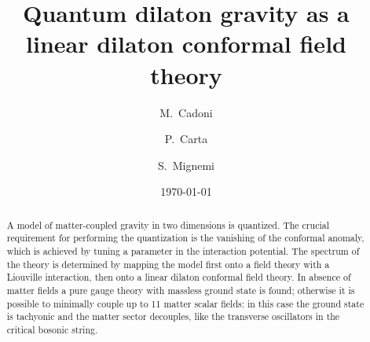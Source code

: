\documentclass[a4paper,aps,prd,twocolumn,groupedaddress]{revtex4}
\begin{document}
\preprint{INFNCA-TH0201]}

\title{Quantum dilaton gravity as a linear dilaton conformal field theory}

\author{M.~Cadoni}
\author{P.~Carta}

\author{S.~Mignemi}


\date{\today}

\begin{abstract}
A model of matter-coupled gravity in two dimensions is quantized.  The
crucial requirement for performing the quantization is the vanishing
of the conformal anomaly, which is achieved by tuning a parameter in
the interaction potential. The spectrum of the theory is determined by
mapping the model first onto a field theory with a Liouville
interaction, then onto a linear dilaton conformal field theory. In
absence of matter fields a pure gauge theory with massless ground
state is found; otherwise it is possible to minimally couple up to 11
matter scalar fields: in this case the ground state is tachyonic and the
matter sector decouples, like the transverse oscillators in the
critical bosonic string.

\end{abstract}


\maketitle
\end{document}
